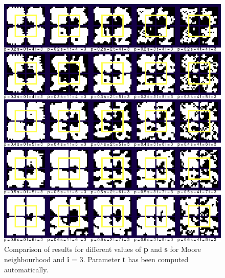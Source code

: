 \documentclass[a4paper, 11pt]{article} %
\begin{document}
\begin{figure}[ht]
	\centering
	\includegraphics[width=1.\textwidth]{moore_sp}
	\caption{Comparison of results for different values of \textbf{p} and \textbf{s} for Moore neighbourhood and \textbf{i} = 3. Parameter \textbf{t} has been computed automatically.}
	\label{fig:results3}
\end{figure}
\end{document}
